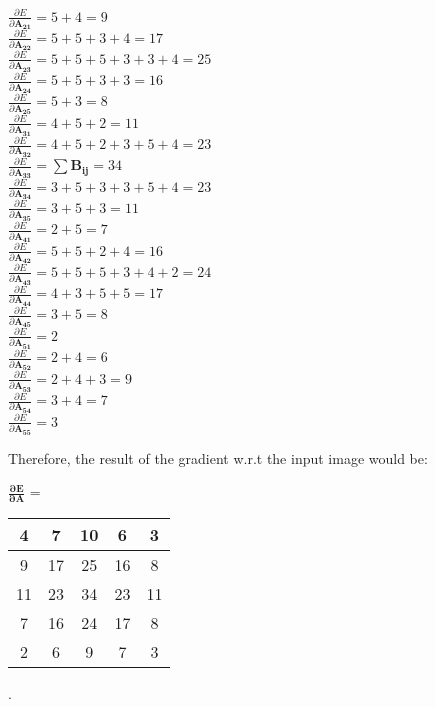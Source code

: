\documentclass[12pt,letterpaper]{article}
\newcommand{\matr}[1]{\bm{#1}}     %
\begin{document}
\begin{itemize}
\begin{center}
     $
     \frac{\partial E}{\partial \matr{A_{21}}} = 5 + 4 = 9 
     $\\
     $
     \frac{\partial E}{\partial \matr{A_{22}}} = 5 + 5 + 3 + 4 = 17
     $\\
     $
     \frac{\partial E}{\partial \matr{A_{23}}} = 5 + 5 + 5 + 3 + 3 + 4 = 25 
     $\\
     $
     \frac{\partial E}{\partial \matr{A_{24}}} = 5 + 5 + 3 + 3 = 16 
     $\\
     $
     \frac{\partial E}{\partial \matr{A_{25}}} = 5 + 3 = 8
     $\\
     $
     \frac{\partial E}{\partial \matr{A_{31}}} = 4 + 5 + 2 = 11
     $\\
     $
     \frac{\partial E}{\partial \matr{A_{32}}} = 4 + 5 + 2 + 3 + 5 + 4 = 23
     $\\
     $
     \frac{\partial E}{\partial \matr{A_{33}}} = \sum \matr{B_{ij}} = 34
     $\\
     $
     \frac{\partial E}{\partial \matr{A_{34}}} = 3 + 5 + 3 + 3 + 5 + 4 = 23
     $\\
     $
     \frac{\partial E}{\partial \matr{A_{35}}} = 3 + 5 + 3 = 11
     $\\
     $
     \frac{\partial E}{\partial \matr{A_{41}}} = 2 + 5 = 7
     $\\
     $
     \frac{\partial E}{\partial \matr{A_{42}}} = 5 + 5 + 2 + 4 = 16
     $\\
     $
     \frac{\partial E}{\partial \matr{A_{43}}} = 5 + 5 + 5 + 3 + 4 + 2 = 24
     $\\
     $
     \frac{\partial E}{\partial \matr{A_{44}}} = 4 + 3 + 5 + 5 = 17
     $\\
     $
     \frac{\partial E}{\partial \matr{A_{45}}} = 3 + 5 = 8
     $\\
     $
     \frac{\partial E}{\partial \matr{A_{51}}} = 2
     $\\
     $
     \frac{\partial E}{\partial \matr{A_{52}}} = 2 + 4 = 6
     $\\
     $
     \frac{\partial E}{\partial \matr{A_{53}}} = 2 + 4 + 3 = 9
     $\\
     $
     \frac{\partial E}{\partial \matr{A_{54}}} = 3 + 4 = 7
     $\\
     $
     \frac{\partial E}{\partial \matr{A_{55}}} = 3
     $
 \end{center}Therefore, the result of the gradient w.r.t the input image would be:
 \begin{center}
     $\matr{\frac{\partial E}{\partial A}}$ =  \begin{tabular}{|c|c|c|c|c|} 
    \hline
       4 & 7 & 10 & 6 & 3 \\ \hline 
       9 & 17 & 25 & 16 & 8 \\ \hline
       11 & 23 & 34 & 23 & 11 \\ \hline 
       7 & 16 & 24 & 17 & 8 \\ \hline
       2 & 6 & 9 & 7 & 3 \\ \hline
    \end{tabular}
 \end{center}
\end{itemize}. 
\end{document}
